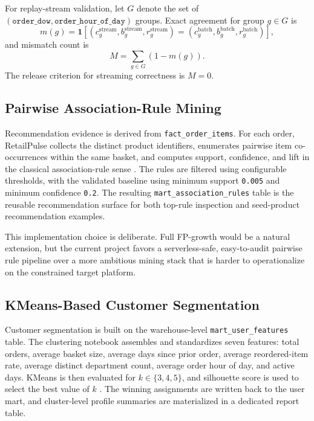 \documentclass[journal]{IEEEtran}
\begin{document}
For replay-stream validation, let \(G\) denote the set of \((\texttt{order\_dow},\texttt{order\_hour\_of\_day})\) groups. Exact agreement for group \(g \in G\) is
\begin{equation}
m(g)=\mathbf{1}\!\left[(c_g^\mathrm{stream}, b_g^\mathrm{stream}, r_g^\mathrm{stream})=(c_g^\mathrm{batch}, b_g^\mathrm{batch}, r_g^\mathrm{batch})\right],
\end{equation}
and mismatch count is
\begin{equation}
M = \sum_{g \in G} (1-m(g)).
\end{equation}
The release criterion for streaming correctness is \(M=0\).

\subsection{Pairwise Association-Rule Mining}
Recommendation evidence is derived from \texttt{fact\_order\_items}. For each order, RetailPulse collects the distinct product identifiers, enumerates pairwise item co-occurrences within the same basket, and computes support, confidence, and lift in the classical association-rule sense \cite{agrawal1994association}. The rules are filtered using configurable thresholds, with the validated baseline using minimum support \texttt{0.005} and minimum confidence \texttt{0.2}. The resulting \texttt{mart\_association\_rules} table is the reusable recommendation surface for both top-rule inspection and seed-product recommendation examples.

This implementation choice is deliberate. Full FP-growth would be a natural extension, but the current project favors a serverless-safe, easy-to-audit pairwise rule pipeline over a more ambitious mining stack that is harder to operationalize on the constrained target platform.

\subsection{KMeans-Based Customer Segmentation}
Customer segmentation is built on the warehouse-level \texttt{mart\_user\_features} table. The clustering notebook assembles and standardizes seven features: total orders, average basket size, average days since prior order, average reordered-item rate, average distinct department count, average order hour of day, and active days. KMeans is then evaluated for \(k \in \{3,4,5\}\), and silhouette score is used to select the best value of \(k\) \cite{macqueen1967kmeans,spark_ml}. The winning assignments are written back to the user mart, and cluster-level profile summaries are materialized in a dedicated report table.
\end{document}
